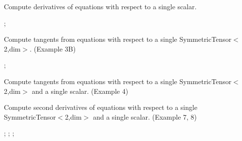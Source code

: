 \begin{DoxyItemize}
\item Compute derivatives of equations with respect to a single scalar.
\end{DoxyItemize}

\href{https://www.codecogs.com/eqnedit.php?latex={D}&space;=&space;\frac{\partial{\Psi}}{\partial{\varphi&space;}}}{\tt } ; \href{https://www.codecogs.com/eqnedit.php?latex=\boldsymbol{A}&space;=&space;\frac{\partial\boldsymbol{\sigma}}{\partial{\varphi&space;}}}{\tt }


\begin{DoxyItemize}
\item Compute tangents from equations with respect to a single Symmetric\+Tensor$<$2,dim$>$. (Example 3B)
\end{DoxyItemize}

\href{https://www.codecogs.com/eqnedit.php?latex=\boldsymbol{B}&space;=&space;\frac{\partial{\Psi}}{\partial\boldsymbol{\varepsilon&space;}}}{\tt } ; \href{https://www.codecogs.com/eqnedit.php?latex=\overset{4}{C}&space;=&space;\frac{\partial\boldsymbol{\sigma}}{\partial\boldsymbol{\varepsilon&space;}}}{\tt }


\begin{DoxyItemize}
\item Compute tangents from equations with respect to a single Symmetric\+Tensor$<$2,dim$>$ and a single scalar. (Example 4)
\end{DoxyItemize}

\href{https://www.codecogs.com/eqnedit.php?latex=\boldsymbol{A,&space;B,&space;}&space;\overset{4}{C}&space;\textrm{&space;and&space;}&space;$D$&space;\text{&space;at&space;the&space;same&space;time}}{\tt }


\begin{DoxyItemize}
\item Compute second derivatives of equations with respect to a single Symmetric\+Tensor$<$2,dim$>$ and a single scalar. (Example 7, 8)
\end{DoxyItemize}

\href{https://www.codecogs.com/eqnedit.php?latex=\overset{4}{C}&space;=&space;\frac{\partial^2\Psi}{\partial\boldsymbol{\varepsilon&space;}^2}}{\tt } ; \href{https://www.codecogs.com/eqnedit.php?latex=\boldsymbol{E}&space;=&space;\frac{\partial^2\Psi}{\partial\boldsymbol{\varepsilon&space;}&space;\partial\varphi&space;}}{\tt } ; \href{https://www.codecogs.com/eqnedit.php?latex=\boldsymbol{F}&space;=&space;\frac{\partial^2\Psi}{\partial\varphi&space;\partial\boldsymbol{\varepsilon&space;}&space;}}{\tt } ; \href{https://www.codecogs.com/eqnedit.php?latex=G&space;=&space;\frac{\partial^2\Psi}{\partial\varphi^2&space;}}{\tt }

